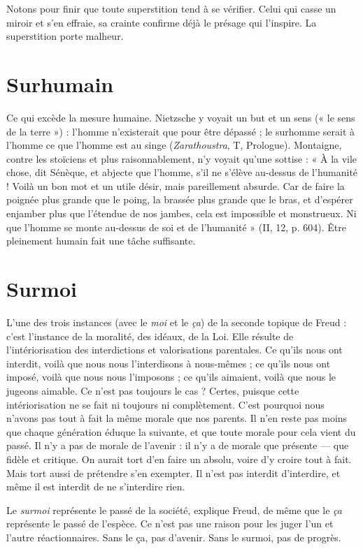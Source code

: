 Notons pour finir que toute superstition tend à se vérifier. Celui qui casse
un miroir et s’en effraie, sa crainte confirme déjà le présage qui l’inspire. La
superstition porte malheur.

\section{Surhumain}
Ce qui excède la mesure humaine. Nietzsche y voyait un but
et un sens (« le sens de la terre ») : l’homme n’existerait que
pour être dépassé ; le surhomme serait à l’homme ce que l’homme est au singe
({\it Zarathoustra}, T, Prologue). Montaigne, contre les stoïciens et plus raisonnablement,
n’y voyait qu’une sottise : « À la vile chose, dit Sénèque, et abjecte que
l’homme, s’il ne s'élève au-dessus de l'humanité ! Voilà un bon mot et un utile
désir, mais pareillement absurde. Car de faire la poignée plus grande que le
poing, la brassée plus grande que le bras, et d’espérer enjamber plus que
l'étendue de nos jambes, cela est impossible et monstrueux. Ni que l’homme se
monte au-dessus de soi et de l'humanité » (II, 12, p. 604). Être pleinement
humain fait une tâche suffisante.

\section{Surmoi}
L'une des trois instances (avec le {\it moi} et le {\it ça}) de la seconde
topique de Freud : c’est l'instance de la moralité, des idéaux, de la
Loi. Elle résulte de l’intériorisation des interdictions et valorisations parentales.
Ce qu’ils nous ont interdit, voilà que nous nous l’interdisons à nous-mêmes ;
ce qu’ils nous ont imposé, voilà que nous nous l’imposons ; ce qu’ils aimaient,
voilà que nous le jugeons aimable. Ce n’est pas toujours le cas ? Certes, puisque
cette intériorisation ne se fait ni toujours ni complètement. C’est pourquoi
nous n'avons pas tout à fait la même morale que nos parents. Il n’en reste pas
moins que chaque génération éduque la suivante, et que toute morale pour cela
vient du passé. Il n’y a pas de morale de l’avenir : il n’y a de morale que présente —
que fidèle et critique. On aurait tort d’en faire un absolu, voire d’y
croire tout à fait. Mais tort aussi de prétendre s’en exempter. Il n’est pas
interdit d'interdire, et même il est interdit de ne s’interdire rien.

Le {\it surmoi} représente le passé de la société, explique Freud, de même que
le {\it ça} représente le passé de l'espèce. Ce n’est pas une raison pour les juger l’un
et l’autre réactionnaires. Sans le ça, pas d’avenir. Sans le surmoi, pas de progrès.

